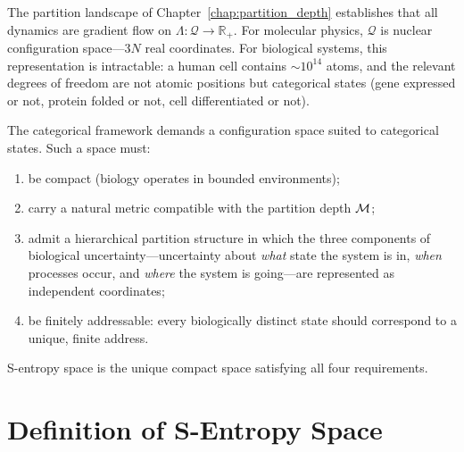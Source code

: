 The partition landscape of Chapter~\ref{chap:partition_depth} establishes that
all dynamics are gradient flow on $\Lambda: \mathcal{Q} \to \mathbb{R}_+$.
For molecular physics, $\mathcal{Q}$ is nuclear configuration space---3$N$
real coordinates. For biological systems, this representation is intractable:
a human cell contains $\sim 10^{14}$ atoms, and the relevant degrees of
freedom are not atomic positions but categorical states (gene expressed or not,
protein folded or not, cell differentiated or not).

The categorical framework demands a configuration space suited to categorical
states. Such a space must:
\begin{enumerate}[label=(\roman*)]
  \item be compact (biology operates in bounded environments);
  \item carry a natural metric compatible with the partition depth $\mathcal{M}$;
  \item admit a hierarchical partition structure in which the three components
        of biological uncertainty---uncertainty about \emph{what} state the
        system is in, \emph{when} processes occur, and \emph{where} the
        system is going---are represented as independent coordinates;
  \item be finitely addressable: every biologically distinct state should
        correspond to a unique, finite address.
\end{enumerate}
S-entropy space is the unique compact space satisfying all four requirements.

\section{Definition of S-Entropy Space}
\label{sec:sentropy_definition}

